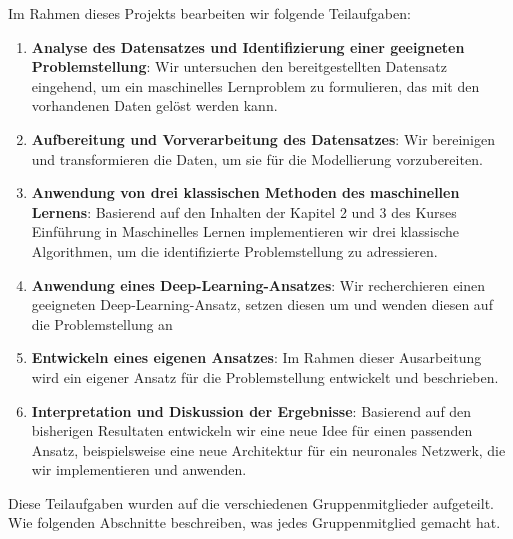 Im Rahmen dieses Projekts bearbeiten wir folgende Teilaufgaben:

\begin{enumerate} 
\item \textbf{Analyse des Datensatzes und Identifizierung einer geeigneten Problemstellung}: Wir untersuchen den bereitgestellten Datensatz eingehend, um ein maschinelles Lernproblem zu formulieren, das mit den vorhandenen Daten gelöst werden kann. 
\item \textbf{Aufbereitung und Vorverarbeitung des Datensatzes}: Wir bereinigen und transformieren die Daten, um sie für die Modellierung vorzubereiten. 
\item \textbf{Anwendung von drei klassischen Methoden des maschinellen Lernens}: Basierend auf den Inhalten der Kapitel 2 und 3 des Kurses \glqq Einführung in Maschinelles Lernen\grqq{} implementieren wir drei klassische Algorithmen, um die identifizierte Problemstellung zu adressieren. 
\item \textbf{Anwendung eines Deep-Learning-Ansatzes}: Wir recherchieren einen geeigneten Deep-Learning-Ansatz, setzen diesen um und wenden diesen auf die Problemstellung an
\item \textbf{Entwickeln eines eigenen Ansatzes}: Im Rahmen dieser Ausarbeitung wird ein eigener Ansatz für die Problemstellung entwickelt und beschrieben. 
\item \textbf{Interpretation und Diskussion der Ergebnisse}: Basierend auf den bisherigen Resultaten entwickeln wir eine neue Idee für einen passenden Ansatz, beispielsweise eine neue Architektur für ein neuronales Netzwerk, die wir implementieren und anwenden. \end{enumerate}

Diese Teilaufgaben wurden auf die verschiedenen Gruppenmitglieder aufgeteilt. Wie folgenden Abschnitte beschreiben, was jedes Gruppenmitglied gemacht hat.




